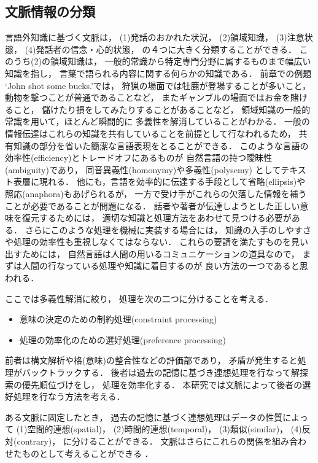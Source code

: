 \subsection{文脈情報の分類}

言語外知識に基づく文脈は，
(1)発話のおかれた状況，
(2)領域知識，
(3)注意状態，
(4)発話者の信念・心的状態，
の４つに大きく分類することができる\cite{Katagiri89}．
このうち(2)の領域知識は，
一般的常識から特定専門分野に属するものまで幅広い知識を指し，
言葉で語られる内容に関する何らかの知識である．
前章での例題 `John shot some bucks.'では，
狩猟の場面では牡鹿が登場することが多いこと，
動物を撃つことが普通であることなど，
またギャンブルの場面ではお金を賭けること，
儲けたり損をしてみたりすることがあることなど，
領域知識の一般的常識を用いて，ほとんど瞬間的に
多義性を解消していることがわかる．
一般の情報伝達はこれらの知識を共有していることを前提として行なわれるため，
共有知識の部分を省いた簡潔な言語表現をとることができる．
このような言語の効率性(efficiency)とトレードオフにあるものが
自然言語の持つ曖昧性(ambiguity)であり，
同音異義性(homonymy)や多義性(polysemy)
としてテキスト表層に現れる\cite{Kojima91}．
他にも，言語を効率的に伝達する手段として省略(ellipsis)や
照応(anaphora)もあげられるが，
一方で受け手がこれらの欠落した情報を補うことが必要であることが問題になる．
話者や著者が伝達しようとした正しい意味を復元するためには，
適切な知識と処理方法をあわせて見つける必要がある．
さらにこのような処理を機械に実装する場合には，
知識の入手のしやすさや処理の効率性も重視しなくてはならない．
これらの要請を満たすものを見い出すためには，
自然言語は人間の用いるコミュニケーションの道具なので，
まずは人間の行なっている処理や知識に着目するのが
良い方法の一つであると思われる．

ここでは多義性解消に絞り，
処理を次の二つに分けることを考える\cite{Tsunoda93}．
\begin{itemize}
  \item 意味の決定のための制約処理(constraint processing)
  \item 処理の効率化のための選好処理(preference processing)
\end{itemize}
前者は構文解析や格(意味)の整合性などの評価部であり，
矛盾が発生すると処理がバックトラックする．
後者は過去の記憶に基づき連想処理を行なって解探索の優先順位づけをし，
処理を効率化する．
本研究では文脈によって後者の選好処理を行なう方法を考える．

ある文脈に固定したとき，
過去の記憶に基づく連想処理はデータの性質によって
(1)空間的連想(spatial)，
(2)時間的連想(temporal)，
(3)類似(similar)，
(4)反対(contrary)，
に分けることができる\cite{Kohonen93}．
文脈はさらにこれらの関係を組み合わせたものとして考えることができる
\cite{Tsunoda93}．

